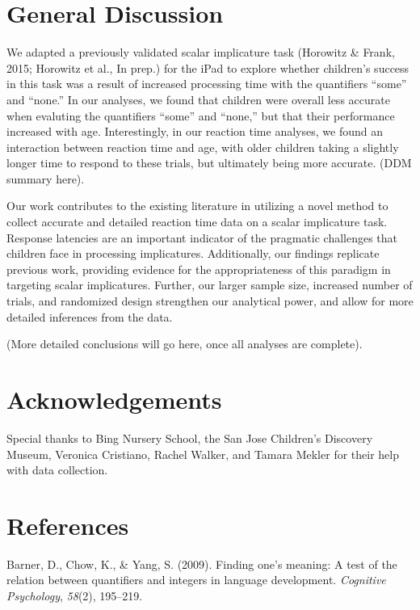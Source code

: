 \documentclass[10pt, letterpaper]{article}
\begin{document}
\section{General Discussion}\label{general-discussion}

We adapted a previously validated scalar implicature task (Horowitz \&
Frank, 2015; Horowitz et al., In prep.) for the iPad to explore whether
children's success in this task was a result of increased processing
time with the quantifiers ``some'' and ``none.'' In our analyses, we
found that children were overall less accurate when evaluting the
quantifiers ``some'' and ``none,'' but that their performance increased
with age. Interestingly, in our reaction time analyses, we found an
interaction between reaction time and age, with older children taking a
slightly longer time to respond to these trials, but ultimately being
more accurate. (DDM summary here).

Our work contributes to the existing literature in utilizing a novel
method to collect accurate and detailed reaction time data on a scalar
implicature task. Response latencies are an important indicator of the
pragmatic challenges that children face in processing implicatures.
Additionally, our findings replicate previous work, providing evidence
for the appropriateness of this paradigm in targeting scalar
implicatures. Further, our larger sample size, increased number of
trials, and randomized design strengthen our analytical power, and allow
for more detailed inferences from the data.

(More detailed conclusions will go here, once all analyses are
complete).

\section{Acknowledgements}\label{acknowledgements}

Special thanks to Bing Nursery School, the San Jose Children's Discovery
Museum, Veronica Cristiano, Rachel Walker, and Tamara Mekler for their
help with data collection.

\section{References}\label{references}

\setlength{\parindent}{-0.1in} \setlength{\leftskip}{0.125in} \noindent

Barner, D., Chow, K., \& Yang, S. (2009). Finding one's meaning: A test
of the relation between quantifiers and integers in language
development. \emph{Cognitive Psychology}, \emph{58}(2), 195--219.
\end{document}
